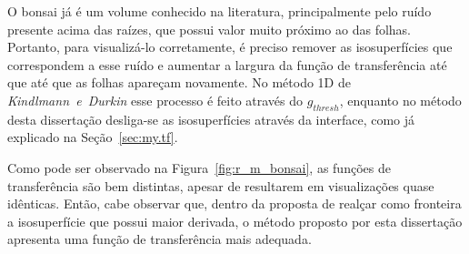 	O bonsai já é um volume conhecido na literatura, principalmente pelo ruído presente acima das raízes, que possui valor muito próximo ao das folhas. Portanto, para visualizá-lo corretamente, é preciso remover as isosuperfícies que correspondem a esse ruído e aumentar a largura da função de transferência até que até que as folhas apareçam novamente. No método 1D de \textit{Kindlmann~e~Durkin} esse processo é feito através do $ g_{thresh} $, enquanto no método desta dissertação desliga-se as isosuperfícies através da interface, como já explicado na Seção~\ref{sec:my.tf}.
	
	Como pode ser observado na Figura~\ref{fig:r_m_bonsai}, as funções de transferência são bem distintas, apesar de resultarem em visualizações quase idênticas. Então, cabe observar que, dentro da proposta de realçar como fronteira a isosuperfície que possui maior derivada, o método proposto por esta dissertação apresenta uma função de transferência mais adequada.
	
